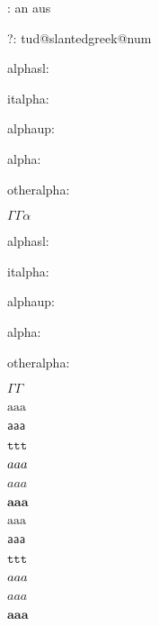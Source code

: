 \documentclass[ngerman,
cdfont=normalbold,
cd=true,
cdfont=ultrabold,
cdfont=false,
tudscrver=2.03,
chapterpage=true
]{tudscrreprt}
\providecommand{\TUDoptions}[1]{}
\begin{document}
\makeatletter
\tud@v@comp: 
\if@tud@relspacing
an
\else
aus
\fi




?: \csname tud@slantedgreek@num\endcsname

alphasl: \meaning\alphasl

italpha: \meaning\italpha

alphaup: \meaning\alphaup

alpha: \meaning\alpha

otheralpha: \meaning\otheralpha


$\Gamma\varGamma\alpha$

\TUDoptions{cdfont=true}

alphasl: \meaning\alphasl

italpha: \meaning\italpha

alphaup: \meaning\alphaup

alpha: \meaning\alpha

otheralpha: \meaning\otheralpha


$\Gamma\varGamma$




$\mathrm{aaa}$

$\mathsf{aaa}$

$\mathtt{ttt}$

$\mathnormal{aaa}$

$\mathit{aaa}$

$\mathbf{aaa}$

{
\boldmath
$\mathrm{aaa}$

$\mathsf{aaa}$

$\mathtt{ttt}$

$\mathnormal{aaa}$

$\mathit{aaa}$

$\mathbf{aaa}$
}


\blinddocument



\blindtext\clearpage

\blindmathpaper
\end{document}
